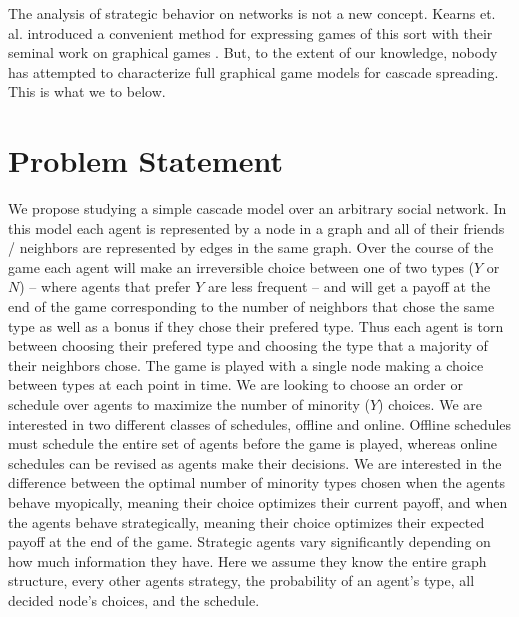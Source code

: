 \documentclass{article}
\begin{document}
The analysis of strategic behavior on networks is not a new concept. Kearns et. al.
introduced a convenient method for expressing games of this sort with their seminal
work on graphical games \cite{Kearns01}. But, to the extent of our knowledge,
nobody has attempted to characterize full graphical game models for cascade spreading.
This is what we to below.


\section{Problem Statement}
\label{prob_statement}
We propose studying a simple cascade model over an arbitrary social
network. In this model each agent is represented by a node in a graph
and all of their friends / neighbors are represented by edges in the
same graph. Over the course of the game each agent will make an
irreversible choice between one of two types ($Y$ or $N$) -- where
agents that prefer $Y$ are less frequent -- and will get a payoff at
the end of the game corresponding to the number of neighbors that
chose the same type as well as a bonus if they chose their prefered
type. Thus each agent is torn between choosing their prefered type and
choosing the type that a majority of their neighbors chose. The game
is played with a single node making a choice between types at each
point in time. We are looking to choose an order or schedule over
agents to maximize the number of minority ($Y$) choices. We are
interested in two different classes of schedules, offline and
online. Offline schedules must schedule the entire set of agents
before the game is played, whereas online schedules can be revised as
agents make their decisions. We are interested in the difference
between the optimal number of minority types chosen when the agents
behave myopically, meaning their choice optimizes their current
payoff, and when the agents behave strategically, meaning their choice
optimizes their expected payoff at the end of the game. Strategic
agents vary significantly depending on how much information they
have. Here we assume they know the entire graph structure, every other
agents strategy, the probability of an agent’s type, all decided
node's choices, and the schedule.
\end{document}
